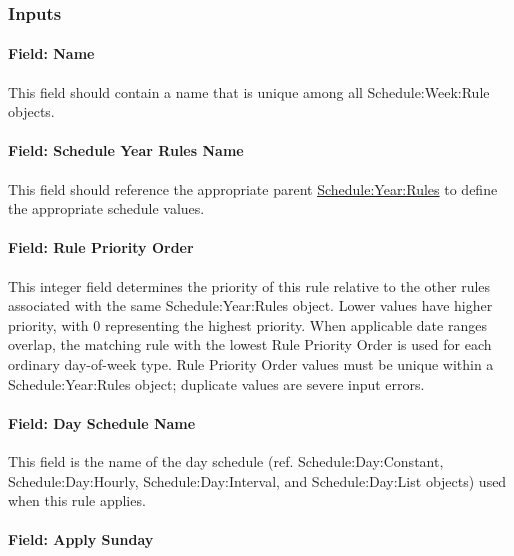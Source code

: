 \subsubsection{Inputs}\label{inputs-scheduleweekrule}

\paragraph{Field: Name}\label{field-name-scheduleweekrule}

This field should contain a name that is unique among all Schedule:Week:Rule objects.

\paragraph{Field: Schedule Year Rules Name}\label{field-schedule-year-rules-name-scheduleweekrule}

This field should reference the appropriate parent \hyperref[scheduleyearrules]{Schedule:Year:Rules} to define the appropriate schedule values.

\paragraph{Field: Rule Priority Order}\label{field-rule-priority-order-scheduleweekrule}

This integer field determines the priority of this rule relative to the other rules associated with the same Schedule:Year:Rules object.
Lower values have higher priority, with 0 representing the highest priority.
When applicable date ranges overlap, the matching rule with the lowest Rule Priority Order is used for each ordinary day-of-week type.
Rule Priority Order values must be unique within a Schedule:Year:Rules object; duplicate values are severe input errors.

\paragraph{Field: Day Schedule Name}\label{field-day-schedule-name-scheduleweekrule}

This field is the name of the day schedule (ref. Schedule:Day:Constant, Schedule:Day:Hourly, Schedule:Day:Interval, and Schedule:Day:List objects) used when this rule applies.

\paragraph{Field: Apply Sunday}\label{field-apply-sunday-scheduleweekrule}

